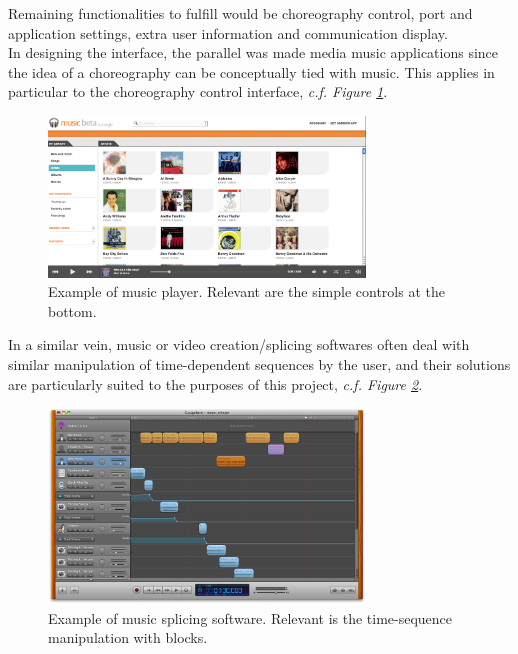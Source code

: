 Remaining functionalities to fulfill would be choreography control, port and application settings, extra user information and communication display.\\

In designing the interface, the parallel was made media music applications since the idea of a choreography can be conceptually tied with music. This applies in particular to the choreography control interface, \textit{c.f. Figure \ref{img:GoogleMusic}}.\\

\begin{figure}[ht]
   \centering
   \includegraphics[width=0.75\textwidth]{img/GoogleMusic.png}
   \caption{Example of music player. Relevant are the simple controls at the bottom.}
   \label{img:GoogleMusic}
\end{figure}

In a similar vein, music or video creation/splicing softwares often deal with similar manipulation of time-dependent sequences by the user, and their solutions are particularly suited to the purposes of this project, \textit{c.f. Figure \ref{img:MusicEditor}}.\\

\begin{figure}[ht]
   \centering
   \includegraphics[width=0.75\textwidth]{img/MusicEditor.png}
   \caption{Example of music splicing software. Relevant is the time-sequence manipulation with blocks.}
   \label{img:MusicEditor}
\end{figure}


